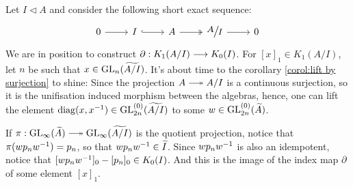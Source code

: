 \begin{construcao}
\label{contru: index map}
    Let $I\triangleleft A$ and consider the following short exact sequence:
    \begin{equation*}
        \begin{tikzcd}
            0 \ar[r] & I \arrow[r, hook] & A \arrow[r, two heads] & \mfrac AI \ar[r] & 0
        \end{tikzcd}
    \end{equation*}
    We are in position to construct $\partial : K_1(A/I) \longrightarrow K_0(I)$. For $[x]_1 \in K_1(A/I)$, let $n$ be such that $x \in \operatorname{GL}_n(\widetilde{A/I})$. It's  about time to the corollary \ref{corol:lift by surjection} to shine: Since the projection $A \longtwoheadrightarrow A/I$ is a continuous surjection, so it is the unifisation induced morphism between the algebras, hence, one can lift the element $\operatorname{diag}(x, {x}^{-1}) \in \operatorname{GL}_{2n}^{(0)}(\widetilde{A/I})$ to some $w \in \operatorname{GL}_{2n}^{(0)}(\widetilde A)$.
    
    If $\pi : \GL_\infty(\widetilde{A}) \longtwoheadrightarrow \GL_\infty(\widetilde{A/I})$ is the quotient projection, notice that $\pi(wp_n{w}^{-1}) = p_n$, so that $wp_n{w}^{-1} \in \widetilde{I}$. Since $wp_n {w}^{-1}$ is also an idempotent, notice that $[wp_n {w}^{-1}]_0 - [p_n]_0 \in K_0(I)$. And this is the image of the index map $\partial$ of some element $[x]_1$.
\end{construcao}

